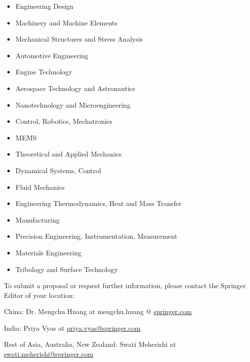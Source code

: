 \documentclass[10pt]{article}
\begin{document}
\begin{itemize}
  \item Engineering Design

  \item Machinery and Machine Elements

  \item Mechanical Structures and Stress Analysis

  \item Automotive Engineering

  \item Engine Technology

  \item Aerospace Technology and Astronautics

  \item Nanotechnology and Microengineering

  \item Control, Robotics, Mechatronics

  \item MEMS

  \item Theoretical and Applied Mechanics

  \item Dynamical Systems, Control

  \item Fluid Mechanics

  \item Engineering Thermodynamics, Heat and Mass Transfer

  \item Manufacturing

  \item Precision Engineering, Instrumentation, Measurement

  \item Materials Engineering

  \item Tribology and Surface Technology

\end{itemize}

To submit a proposal or request further information, please contact the Springer Editor of your location:

China: Dr. Mengchu Huang at mengchu.huang @ \href{http://springer.com}{springer.com}

India: Priya Vyas at \href{mailto:priya.vyas@springer.com}{priya.vyas@springer.com}

Rest of Asia, Australia, New Zealand: Swati Meherishi at \href{mailto:swati.meherishi@springer.com}{swati.meherishi@springer.com}
\end{document}
